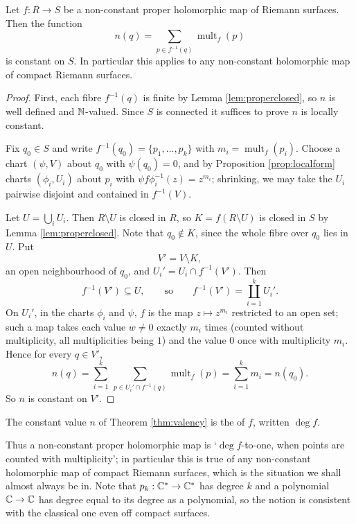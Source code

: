 \documentclass[a4paper]{scrartcl}
\newcommand{\Cs}{\C^*}
\newcommand{\mult}{\operatorname{mult}}
\begin{document}
\begin{theorem}\label{thm:valency}
	Let $f : R \to S$ be a non-constant proper holomorphic map of Riemann surfaces. Then
	the function
	$$
	n(q) = \sum_{p \in f^{-1}(q)} \mult_f(p)
	$$
	is constant on $S$. In particular this applies to any non-constant holomorphic map of
	compact Riemann surfaces.
\end{theorem}

\begin{proof}
	First, each fibre $f^{-1}(q)$ is finite by Lemma \ref{lem:properclosed}, so $n$ is well
	defined and $\mathbb{N}$-valued. Since $S$ is connected it suffices to prove $n$ is locally
	constant.

	Fix $q_0 \in S$ and write $f^{-1}(q_0) = \{p_1, \dots, p_k\}$ with
	$m_i = \mult_f(p_i)$. Choose a chart $(\psi, V)$ about $q_0$ with $\psi(q_0) = 0$, and
	by Proposition \ref{prop:localform} charts $(\phi_i, U_i)$ about $p_i$ with
	$\psi f\phi_i^{-1}(z) = z^{m_i}$; shrinking, we may take the $U_i$ pairwise disjoint and
	contained in $f^{-1}(V)$.

	Let $U = \bigcup_i U_i$. Then $R \setminus U$ is closed in $R$, so
	$K = f(R\setminus U)$ is closed in $S$ by Lemma \ref{lem:properclosed}. Note that
	$q_0 \notin K$, since the whole fibre over $q_0$ lies in $U$. Put
	$$
	V' = V \setminus K,
	$$
	an open neighbourhood of $q_0$, and $U_i' = U_i \cap f^{-1}(V')$. Then
	$$
	f^{-1}(V') \subseteq U, \qquad \text{so} \qquad f^{-1}(V') = \coprod_{i=1}^k U_i'.
	$$
	On $U_i'$, in the charts $\phi_i$ and $\psi$, $f$ is the map $z \mapsto z^{m_i}$
	restricted to an open set; such a map takes each value $w \neq 0$ exactly $m_i$ times
	(counted without multiplicity, all multiplicities being $1$) and the value $0$ once with
	multiplicity $m_i$. Hence for every $q \in V'$,
	$$
	n(q) = \sum_{i=1}^{k}\ \sum_{p\in U_i' \cap f^{-1}(q)}\mult_f(p) = \sum_{i=1}^k m_i = n(q_0).
	$$
	So $n$ is constant on $V'$.
\end{proof}

\begin{definition}[Degree]
	The constant value $n$ of Theorem \ref{thm:valency} is the  of $f$,
	written $\deg f$.
\end{definition}

Thus a non-constant proper holomorphic map is `$\deg f$-to-one, when points are counted
with multiplicity'; in particular this is true of any non-constant holomorphic map of
compact Riemann surfaces, which is the situation we shall almost always be in. Note that
$p_k : \Cs\to\Cs$ has degree $k$ and a polynomial $\mathbb{C}\to\mathbb{C}$ has degree equal to its degree
as a polynomial, so the notion is consistent with the classical one even off compact
surfaces.
\end{document}
